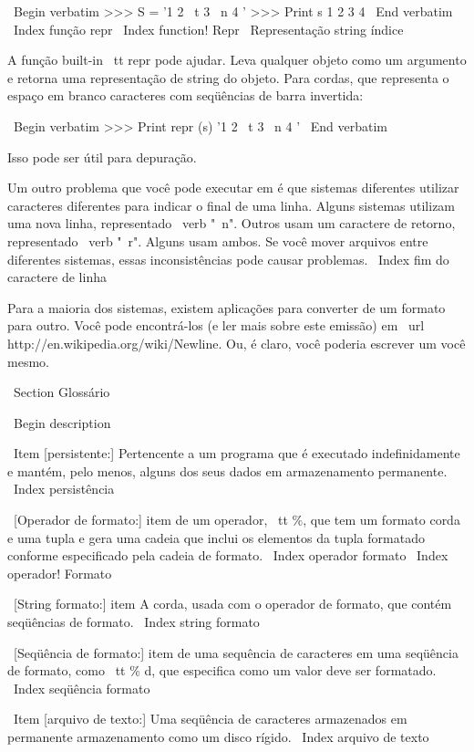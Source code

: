 \documentclass[10pt]{book}
\begin{document}
\begin {itemize}
{{{{{{{{{{{\ Begin {verbatim}
>>> S = '1 2 \ t 3 \ n 4 '
>>> Print s
1 2 3
 4
\ End {verbatim}
\ Index {função repr}
\ Index {function! Repr}
\ {Representação string} índice

A função built-in {\ tt repr} pode ajudar. Leva qualquer objeto como um
argumento e retorna uma representação de string do objeto. Para
cordas, que representa o espaço em branco
caracteres com seqüências de barra invertida:

\ Begin {verbatim}
>>> Print repr (s)
'1 2 \ t 3 \ n 4 '
\ End {verbatim}

Isso pode ser útil para depuração.

Um outro problema que você pode executar em é que sistemas diferentes
utilizar caracteres diferentes para indicar o final de uma linha. Alguns
sistemas utilizam uma nova linha, representado \ verb "\ n". Outros usam
um caractere de retorno, representado \ verb "\ r". Alguns usam ambos.
Se você mover arquivos entre diferentes sistemas, essas inconsistências
pode causar problemas.
\ Index {fim do caractere de linha}

Para a maioria dos sistemas, existem aplicações para converter de um
formato para outro. Você pode encontrá-los (e ler mais sobre este
emissão) em \ url {http://en.wikipedia.org/wiki/Newline}. Ou, é claro, você
poderia escrever um você mesmo.


\ Section {} Glossário

\ Begin {description}

\ Item [persistente:] Pertencente a um programa que é executado indefinidamente
e mantém, pelo menos, alguns dos seus dados em armazenamento permanente.
\ Index {persistência}

\ [Operador de formato:] item de um operador, {\ tt \%}, que tem um formato
corda e uma tupla e gera uma cadeia que inclui
os elementos da tupla formatado conforme especificado pela cadeia de formato.
\ Index {operador formato}
\ Index {operador! Formato}

\ [String formato:] item A corda, usada com o operador de formato, que
contém seqüências de formato.  
\ Index {string formato}

\ [Seqüência de formato:] item de uma sequência de caracteres em uma seqüência de formato,
como {\ tt \% d}, que especifica como um valor deve ser formatado.
\ Index {seqüência formato}

\ Item [arquivo de texto:] Uma seqüência de caracteres armazenados em permanente
armazenamento como um disco rígido.
\ Index {arquivo de texto}

}}}}}}}}}}}
\end{itemize}
\end{document}
